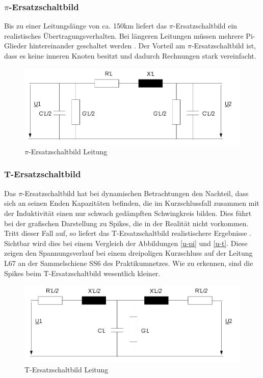 \documentclass{scrartcl}
\begin{document}
\begin{onehalfspace}
\subsubsection{$\pi$-Ersatzschaltbild}
Bis zu einer Leitungslänge von ca. 150km liefert das $\pi$-Ersatzschaltbild ein realistisches Übertragungsverhalten. Bei längeren Leitungen müssen mehrere Pi-Glieder hintereinander geschaltet werden \cite[S. 216]{Heuck2007}. Der Vorteil am $\pi$-Ersatzschaltbild ist, dass es keine inneren Knoten besitzt und dadurch Rechnungen stark vereinfacht.

	\begin{figure}[H]
	\centering
	\includegraphics[scale=0.5]{img/pi-esb.png}
	\caption{$\pi$-Ersatzschaltbild Leitung}
	\label{pi-esb}
	\end{figure}

\subsubsection{T-Ersatzschaltbild}
Das $\pi$-Ersatzschaltbild hat bei dynamischen Betrachtungen den Nachteil, dass sich an seinen Enden Kapazitäten befinden, die im Kurzschlussfall zusammen mit der Induktivität einen nur schwach gedämpften Schwingkreis bilden. Dies führt bei der grafischen Darstellung zu \glqq Spikes\grqq{}, die in der Realität nicht vorkommen. Tritt dieser Fall auf, so liefert das T-Ersatzschaltbild realistischere Ergebnisse \cite[Verfahrensbeschreibung $\rightarrow$ Netzelemente]{netomac-hilfe}. Sichtbar wird dies bei einem Vergleich der Abbildungen \ref{u-pi} und \ref{u-t}. Diese zeigen den Spannungsverlauf bei einem dreipoligen Kurzschluss auf der Leitung L67 an der Sammelschiene SS6 des Praktikumnetzes. Wie zu erkennen, sind die \glqq Spikes\grqq{} beim T-Ersatzschaltbild wesentlich kleiner.

	\begin{figure}[H]
	\centering
	\includegraphics[scale=0.5]{img/t-esb.png}
	\caption{T-Ersatzschaltbild Leitung}
	\label{t-esb}
	\end{figure}
	

\end{onehalfspace}
\end{document}
